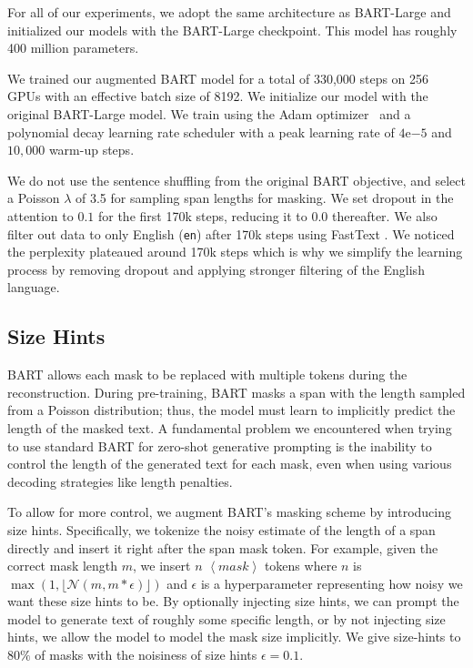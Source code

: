\documentclass[11pt,a4paper]{article}
\begin{document}
For all of our experiments, we adopt the same architecture as BART-Large and initialized our models with the BART-Large checkpoint. This model has roughly 400 million parameters.

We trained our augmented BART model for a total of 330,000 steps on 256 GPUs with an effective batch size of 8192. We initialize our model with the original BART-Large model. We train using the Adam optimizer~\citep{ADAM} and a polynomial decay learning rate scheduler with a peak learning rate of $4\mathrm{e}{-5}$ and $10,000$ warm-up steps.

We do not use the sentence shuffling from the original BART objective, and select a Poisson $\lambda$ of 3.5 for sampling span lengths for masking. We set dropout in the attention to $0.1$ for the first 170k steps, reducing it to $0.0$ thereafter. We also filter out data to only English (\verb+en+) after 170k steps using FastText \cite{fasttext}. We noticed the perplexity plateaued around 170k steps which is why we simplify the learning process by removing dropout and applying stronger filtering of the English language. 

\subsection{Size Hints}
\label{sec:model:size-hints}

BART allows each mask to be replaced with multiple tokens during the reconstruction. During pre-training, BART masks a span with the length sampled from a Poisson distribution; thus, the model must learn to implicitly predict the length of the masked text. A fundamental problem we encountered when trying to use standard BART for zero-shot generative prompting is the inability to control the length of the generated text for each mask, even when using various decoding strategies like length penalties. 

To allow for more control, we augment BART's masking scheme by introducing size hints. Specifically, we tokenize the noisy estimate of the length of a span directly and insert it right after the span mask token. For example, given the correct mask length $m$, we insert $n$ \textit{$\left<mask\right>$} tokens where $n$ is $\max\left(1,\lfloor\mathcal{N}(m, m * \epsilon)\rfloor\right)$ and $\epsilon$ is a hyperparameter representing how noisy we want these size hints to be. By optionally injecting size hints, we can prompt the model to generate text of roughly some specific length, or by not injecting size hints, we allow the model to model the mask size implicitly. We give size-hints to $80\%$ of masks with the noisiness of size hints $\epsilon=0.1$. 
\end{document}
